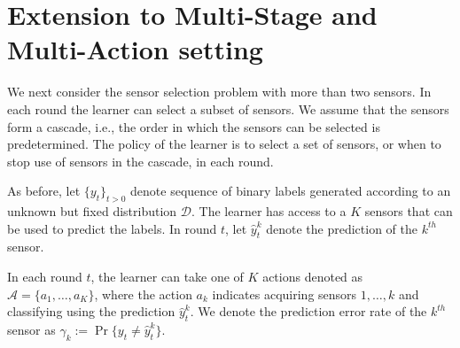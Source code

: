 \documentclass[draft, onecolumn, 12pt]{IEEEtran}
\begin{document}
\section{Extension to Multi-Stage and Multi-Action setting}
We next consider the sensor selection problem with more than two sensors. In each round the learner can select a subset of sensors. %
We assume that the sensors form a cascade, i.e., the order in which the sensors can be selected is predetermined. The policy of the learner is to select a set of sensors, or when to stop use of sensors in the cascade, in each round.  
 
 
As before, let $\{y_t\}_{{t>0}}$ denote sequence of binary labels generated according to an unknown but fixed distribution $\mathcal{D}$.  The learner has access to a $K$ sensors that can be used to predict the labels. In round $t$, let $\hat{y}^k_t$ denote the prediction of the $k^{th}$ sensor. 


In each round $t$, the learner can take one of $K$ actions denoted as $\mathcal{A}=\{a_1,\ldots,a_K\}$, where  the action $a_k$ indicates acquiring sensors $1,\ldots,k$ and classifying using the prediction $\hat{y}^k_t$. We denote the prediction error rate of the $k^{th}$ sensor as $\gamma_k:=\Pr\{y_t\neq \hat{y}^k_t\}.$
\end{document}
